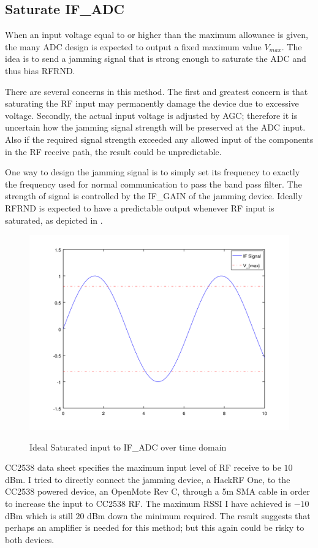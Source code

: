 \subsection{Saturate IF\_ADC}

When an input voltage equal to or higher than the maximum allowance is given, the many ADC design is expected to output a fixed maximum value $V_{max}$. The idea is to send a jamming signal that is strong enough to saturate the ADC and thus bias RFRND.

There are several concerns in this method.  The first and greatest concern is that saturating the RF input may permanently damage the device due to excessive voltage. Secondly, the actual input voltage is adjusted by AGC; therefore it is uncertain how the jamming signal strength will be preserved at the ADC input. Also if the required signal strength exceeded any allowed input of the components in the RF receive path, the result could be unpredictable.

One way to design the jamming signal is to simply set its frequency to exactly the frequency used for normal communication to pass the band pass filter. The strength of signal is controlled by the IF\_GAIN of the jamming device. Ideally RFRND is expected to have a predictable output whenever RF input is saturated, as depicted in .

\begin{figure}
\center
\caption{Ideal Saturated input to IF\_ADC over time domain}
\includegraphics[width=\textwidth]{figures/saturate.png}
\label{Saturate_ADC}
\end{figure}

CC2538 data sheet specifies the maximum input level of RF receive to be $10$ dBm. I tried to directly connect the jamming device, a HackRF One, to the CC2538 powered device, an OpenMote Rev C, through a 5m SMA cable in order to increase the input to CC2538 RF. The maximum RSSI I have achieved is $-10$ dBm which is still $20$ dBm down the minimum required. The result suggests that perhaps an amplifier is needed for this method; but this again could be risky to both devices.
